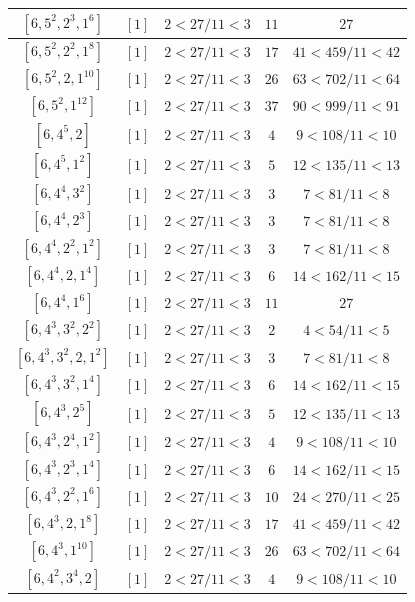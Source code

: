 \documentclass{article}%
\begin{document}
\begin{center}
\begin{longtable}{||c|c|c|c|c||}
$[6, 5^{2}, 2^{3}, 1^{6}]$ & $[1]$ & $2 < 27/11 < 3$ & $11$ & $27$ \\ \hline 
$[6, 5^{2}, 2^{2}, 1^{8}]$ & $[1]$ & $2 < 27/11 < 3$ & $17$ & $41 < 459/11 < 42$ \\ \hline 
$[6, 5^{2}, 2, 1^{10}]$ & $[1]$ & $2 < 27/11 < 3$ & $26$ & $63 < 702/11 < 64$ \\ \hline 
$[6, 5^{2}, 1^{12}]$ & $[1]$ & $2 < 27/11 < 3$ & $37$ & $90 < 999/11 < 91$ \\ \hline 
$[6, 4^{5}, 2]$ & $[1]$ & $2 < 27/11 < 3$ & $4$ & $9 < 108/11 < 10$ \\ \hline 
$[6, 4^{5}, 1^{2}]$ & $[1]$ & $2 < 27/11 < 3$ & $5$ & $12 < 135/11 < 13$ \\ \hline 
$[6, 4^{4}, 3^{2}]$ & $[1]$ & $2 < 27/11 < 3$ & $3$ & $7 < 81/11 < 8$ \\ \hline 
$[6, 4^{4}, 2^{3}]$ & $[1]$ & $2 < 27/11 < 3$ & $3$ & $7 < 81/11 < 8$ \\ \hline 
$[6, 4^{4}, 2^{2}, 1^{2}]$ & $[1]$ & $2 < 27/11 < 3$ & $3$ & $7 < 81/11 < 8$ \\ \hline 
$[6, 4^{4}, 2, 1^{4}]$ & $[1]$ & $2 < 27/11 < 3$ & $6$ & $14 < 162/11 < 15$ \\ \hline 
$[6, 4^{4}, 1^{6}]$ & $[1]$ & $2 < 27/11 < 3$ & $11$ & $27$ \\ \hline 
$[6, 4^{3}, 3^{2}, 2^{2}]$ & $[1]$ & $2 < 27/11 < 3$ & $2$ & $4 < 54/11 < 5$ \\ \hline 
$[6, 4^{3}, 3^{2}, 2, 1^{2}]$ & $[1]$ & $2 < 27/11 < 3$ & $3$ & $7 < 81/11 < 8$ \\ \hline 
$[6, 4^{3}, 3^{2}, 1^{4}]$ & $[1]$ & $2 < 27/11 < 3$ & $6$ & $14 < 162/11 < 15$ \\ \hline 
$[6, 4^{3}, 2^{5}]$ & $[1]$ & $2 < 27/11 < 3$ & $5$ & $12 < 135/11 < 13$ \\ \hline 
$[6, 4^{3}, 2^{4}, 1^{2}]$ & $[1]$ & $2 < 27/11 < 3$ & $4$ & $9 < 108/11 < 10$ \\ \hline 
$[6, 4^{3}, 2^{3}, 1^{4}]$ & $[1]$ & $2 < 27/11 < 3$ & $6$ & $14 < 162/11 < 15$ \\ \hline 
$[6, 4^{3}, 2^{2}, 1^{6}]$ & $[1]$ & $2 < 27/11 < 3$ & $10$ & $24 < 270/11 < 25$ \\ \hline 
$[6, 4^{3}, 2, 1^{8}]$ & $[1]$ & $2 < 27/11 < 3$ & $17$ & $41 < 459/11 < 42$ \\ \hline 
$[6, 4^{3}, 1^{10}]$ & $[1]$ & $2 < 27/11 < 3$ & $26$ & $63 < 702/11 < 64$ \\ \hline 
$[6, 4^{2}, 3^{4}, 2]$ & $[1]$ & $2 < 27/11 < 3$ & $4$ & $9 < 108/11 < 10$ \\ \hline 

\end{longtable}
\end{center}
\end{document}
